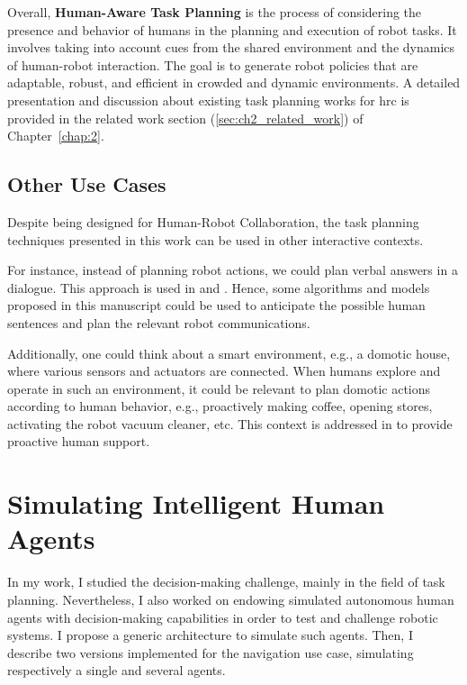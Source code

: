 Overall, \textbf{Human-Aware Task Planning} is the process of considering the presence and behavior of humans in the planning and execution of robot tasks. It involves taking into account cues from the shared environment and the dynamics of human-robot interaction. The goal is to generate robot policies that are adaptable, robust, and efficient in crowded and dynamic environments. A detailed presentation and discussion about existing task planning works for \acrshort{hrc} is provided in the related work section (\ref{sec:ch2_related_work}) of Chapter~\ref{chap:2}.  

\subsection{Other Use Cases}

Despite being designed for Human-Robot Collaboration, the task planning techniques presented in this work can be used in other interactive contexts. 

For instance, instead of planning robot actions, we could plan verbal answers in a dialogue. 
This approach is used in \cite{de_carolis_verbal_2000} and \cite{de_carolis_behavior_2001}.
Hence, some algorithms and models proposed in this manuscript could be used to anticipate the possible human sentences and plan the relevant robot communications. 

Additionally, one could think about a smart environment, e.g., a domotic house, where various sensors and actuators are connected. When humans explore and operate in such an environment, it could be relevant to plan domotic actions according to human behavior, e.g., proactively making coffee, opening stores, activating the robot vacuum cleaner, etc. This context is addressed in \cite{pecora_constraint_based_2012} to provide proactive human support.


\section{Simulating Intelligent Human Agents}

In my work, I studied the decision-making challenge, mainly in the field of task planning. 
Nevertheless, I also worked on endowing simulated autonomous human agents with decision-making capabilities in order to test and challenge robotic systems.
I propose a generic architecture to simulate such agents. Then, I describe two versions implemented for the navigation use case, simulating respectively a single and several agents. 

